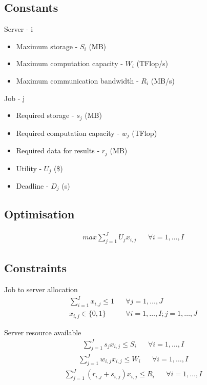 \documentclass[fleqn]{article}
\begin{document}
\subsection{Constants}\label{subsec:constants}
Server - i
\begin{itemize}
    \item Maximum storage - $ S_i $ (MB)
    \item Maximum computation capacity - $ W_i $ (TFlop/s)
    \item Maximum communication bandwidth - $ R_i $ (MB/s)
\end{itemize}
Job - j
\begin{itemize}
    \item Required storage - $ s_j $ (MB)
    \item Required computation capacity - $ w_j $ (TFlop)
    \item Required data for results - $ r_j $ (MB)
    \item Utility - $ U_j $ (\$)
    \item Deadline - $ D_j $ (s)
\end{itemize}

\subsection{Optimisation}\label{subsec:optimisation}
\begin{align}
    max \sum_{j=1}^{J} U_j x_{i,j} && \forall i = 1,\dots,I
\end{align}

\subsection{Constraints}\label{subsec:constraints}
Job to server allocation
\begin{align}
    \sum_{i=1}^I x_{i,j} \leq 1 && \forall j = 1,\dots,J \\
    x_{i,j} \in \{0, 1\} && \forall i = 1,\dots,I; j = 1,\dots,J
\end{align}

Server resource available
\begin{align}
    \sum_{j=1}^J s_j x_{i,j} \leq S_i && \forall i = 1,\dots,I
\end{align}
\begin{align}
    \sum_{j=1}^J w_{i,j} x_{i,j} \leq W_i && \forall i = 1,\dots,I
\end{align}
\begin{align}
    \sum_{j=1}^J (r_{i,j} + s_{i,j}) x_{i,j} \leq R_i && \forall i = 1,\dots,I
\end{align}
\end{document}
